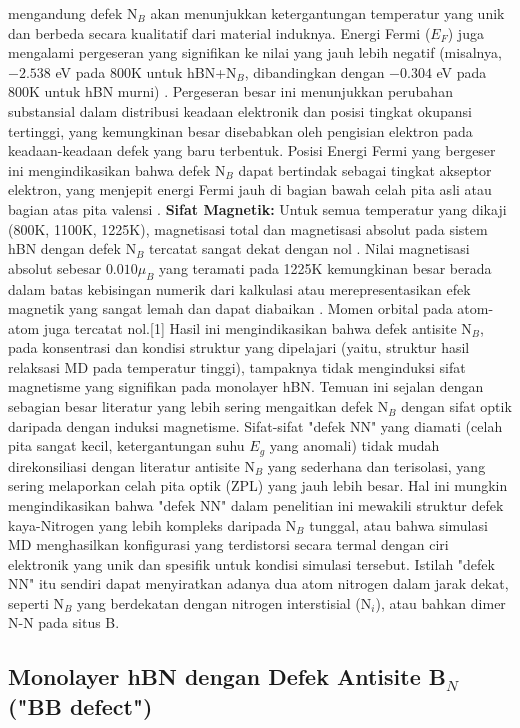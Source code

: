 mengandung defek N$_B$ akan menunjukkan ketergantungan temperatur yang unik dan berbeda secara kualitatif dari material induknya. Energi Fermi ($E_F$) juga mengalami pergeseran yang signifikan ke nilai yang jauh lebih negatif (misalnya, $-2.538$ eV pada 800K untuk hBN+N$_B$, dibandingkan dengan $-0.304$ eV pada 800K untuk hBN murni) . Pergeseran besar ini menunjukkan perubahan substansial dalam distribusi keadaan elektronik dan posisi tingkat okupansi tertinggi, yang kemungkinan besar disebabkan oleh pengisian elektron pada keadaan-keadaan defek yang baru terbentuk. Posisi Energi Fermi yang bergeser ini mengindikasikan bahwa defek N$_B$ dapat bertindak sebagai tingkat akseptor elektron, yang menjepit energi Fermi jauh di bagian bawah celah pita asli atau bagian atas pita valensi . \textbf{Sifat Magnetik:}
Untuk semua temperatur yang dikaji (800K, 1100K, 1225K), magnetisasi total dan magnetisasi absolut pada sistem hBN dengan defek N$_B$ tercatat sangat dekat dengan nol . Nilai magnetisasi absolut sebesar $0.010 \mu_B$ yang teramati pada 1225K kemungkinan besar berada dalam batas kebisingan numerik dari kalkulasi atau merepresentasikan efek magnetik yang sangat lemah dan dapat diabaikan . Momen orbital pada atom-atom juga tercatat nol.[1] Hasil ini mengindikasikan bahwa defek antisite N$_B$, pada konsentrasi dan kondisi struktur yang dipelajari (yaitu, struktur hasil relaksasi MD pada temperatur tinggi), tampaknya tidak menginduksi sifat magnetisme yang signifikan pada monolayer hBN. Temuan ini sejalan dengan sebagian besar literatur yang lebih sering mengaitkan defek N$_B$ dengan sifat optik daripada dengan induksi magnetisme. Sifat-sifat "defek NN" yang diamati (celah pita sangat kecil, ketergantungan suhu $E_g$ yang anomali) tidak mudah direkonsiliasi dengan literatur antisite N$_B$ yang sederhana dan terisolasi, yang sering melaporkan celah pita optik (ZPL) yang jauh lebih besar. Hal ini mungkin mengindikasikan bahwa "defek NN" dalam penelitian ini mewakili struktur defek kaya-Nitrogen yang lebih kompleks daripada N$_B$ tunggal, atau bahwa simulasi MD menghasilkan konfigurasi yang terdistorsi secara termal dengan ciri elektronik yang unik dan spesifik untuk kondisi simulasi tersebut. Istilah "defek NN" itu sendiri dapat menyiratkan adanya dua atom nitrogen dalam jarak dekat, seperti N$_B$ yang berdekatan dengan nitrogen interstisial (N$_i$), atau bahkan dimer N-N pada situs B. \subsection{Monolayer hBN dengan Defek Antisite B$_N$ ("BB defect")}
